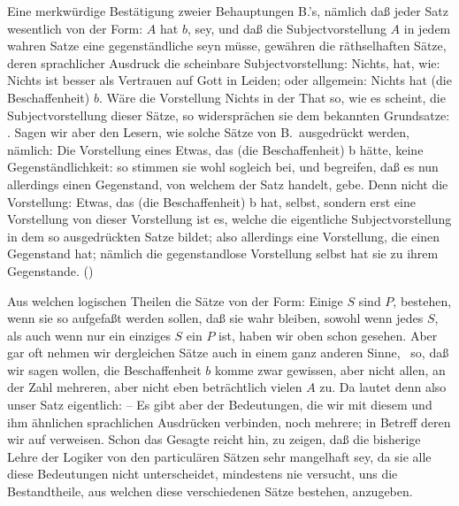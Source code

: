 Eine merkwürdige Bestätigung zweier Behauptungen B.'s, nämlich daß jeder Satz wesentlich von der Form: $A$ hat $b$, sey, und daß die Subjectvorstellung $A$ in jedem wahren Satze eine gegenständliche seyn müsse, gewähren die räthselhaften Sätze, deren sprachlicher Ausdruck die scheinbare Subjectvorstellung: Nichts, hat, wie: Nichts ist besser als Vertrauen auf Gott in Leiden; oder allgemein: Nichts hat (die Beschaffenheit) $b$. Wäre die Vorstellung Nichts in der That so, wie es scheint, die Subjectvorstellung dieser Sätze, so widersprächen sie dem bekannten Grundsatze: . Sagen wir aber den Lesern, wie solche Sätze von B.\ ausgedrückt werden, nämlich: Die Vorstellung eines Etwas, das (die Beschaffenheit) b hätte,  keine Gegenständlichkeit: so stimmen sie wohl sogleich bei, und begreifen, daß es nun allerdings einen Gegenstand, von welchem der Satz handelt, gebe. Denn nicht die Vorstellung: Etwas, das (die Beschaffenheit) b hat, selbst, sondern erst eine Vorstellung von dieser Vorstellung ist es, welche die eigentliche Subjectvorstellung in dem so ausgedrückten Satze bildet; also allerdings eine Vorstellung, die einen Gegenstand hat; nämlich die gegenstandlose Vorstellung selbst hat sie zu ihrem Gegenstande. () \par
Aus welchen logischen Theilen die Sätze von der Form: Einige $S$ sind $P$, bestehen, wenn sie so aufgefaßt werden sollen, daß sie wahr bleiben, sowohl wenn jedes $S$, als auch wenn nur ein einziges $S$ ein $P$ ist, haben wir oben schon gesehen. Aber gar oft nehmen wir dergleichen Sätze auch in einem ganz anderen Sinne, \zB\ so, daß wir sagen wollen, die Beschaffenheit $b$ komme zwar gewissen, aber nicht allen, an der Zahl mehreren, aber nicht eben beträchtlich vielen $A$  zu. Da lautet denn also unser Satz eigentlich:  -- Es gibt aber der Bedeutungen, die wir mit diesem und ihm ähnlichen sprachlichen Ausdrücken verbinden, noch mehrere; in Betreff deren wir auf  verweisen. Schon das Gesagte reicht hin, zu zeigen, daß die bisherige Lehre der Logiker von den particulären Sätzen sehr mangelhaft sey, da sie alle diese Bedeutungen nicht unterscheidet, mindestens nie versucht, uns die Bestandtheile, aus welchen diese verschiedenen Sätze bestehen, anzugeben. \par
